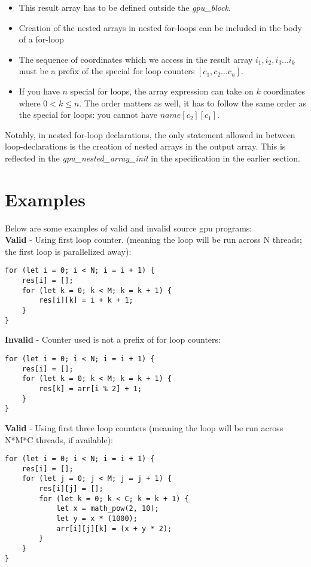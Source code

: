 \begin{itemize}
    \item{This result array has to be defined outside the \textit{gpu\_block}.}
    \item{Creation of the nested arrays in nested for-loops can be included in the body of a for-loop}
    \item{The sequence of coordinates which we access in the result array ${{i_1}, {i_2}, {i_3} ... i_{k}}$ must be a 
        prefix of the special for loop counters ${[c_1,c_2 ... c_n]}$.}
    \item{ If you have ${n}$ special for loops, the array expression can take on ${k}$ coordinates where ${0 < k \leq n}$. 
    The order matters as well, it has to follow the same order as the special for loops: you cannot have ${name[c_2][c_1]}$.}
\end{itemize}

Notably, in nested for-loop declarations, the only statement allowed in between loop-declarations is the creation of nested arrays in the output array. This is reflected in the \textit{gpu\_nested\_array\_init} in the specification in the earlier section. 

\section*{Examples}

Below are some examples of valid and invalid source gpu programs:\\

\textbf{Valid} - Using first loop counter. (meaning the loop will be run across N threads; the first loop is parallelized away):
\begin{verbatim}
for (let i = 0; i < N; i = i + 1) {
    res[i] = [];
    for (let k = 0; k < M; k = k + 1) {
        res[i][k] = i + k + 1;
    }
}
\end{verbatim}

\textbf{Invalid} - Counter used is not a prefix of for loop counters:
\begin{verbatim}
for (let i = 0; i < N; i = i + 1) {
    res[i] = [];
    for (let k = 0; k < M; k = k + 1) {
        res[k] = arr[i % 2] + 1;
    }
}
\end{verbatim}

\textbf{Valid} - Using first three loop counters (meaning the loop will be run across N*M*C threads, if available):
\begin{verbatim}
for (let i = 0; i < N; i = i + 1) {
    res[i] = [];
    for (let j = 0; j < M; j = j + 1) {
        res[i][j] = [];
        for (let k = 0; k < C; k = k + 1) {
            let x = math_pow(2, 10);
            let y = x * (1000);
            arr[i][j][k] = (x + y * 2);
        }
    }
}
\end{verbatim}

